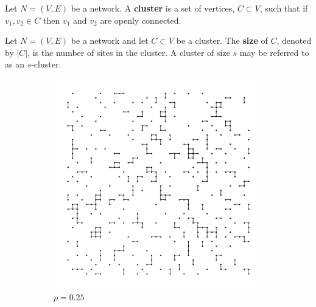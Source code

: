 \begin{definition}\label{def:cluster}
  Let $N=(V, E)$ be a network. A \textbf{cluster} is a set of vertices, $C \subset V$, such that if $v_1, v_2 \in C$ then $v_1$ and $v_2$ are openly connected.
\end{definition}

\begin{definition}\label{def:cluster size}
  Let $N=(V, E)$ be a network and let $C \subset V$ be a cluster. The \textbf{size} of $C$, denoted by $|C|$, is the number of sites in the cluster. A cluster of size $s$ may be
  referred to as an $s$-cluster.
\end{definition}

\begin{figure}[p]
  \centering
  \begin{subfigure}[b]{0.45\textwidth}
    \centering
    \includegraphics[width=\textwidth]{1/percolation1}
    \caption{$p=0.25$}
    \label{fig:p=0.25}
  \end{subfigure}
  \hfill
  \begin{subfigure}[b]{0.45\textwidth}
    \centering

\end{subfigure}
\end{figure}
